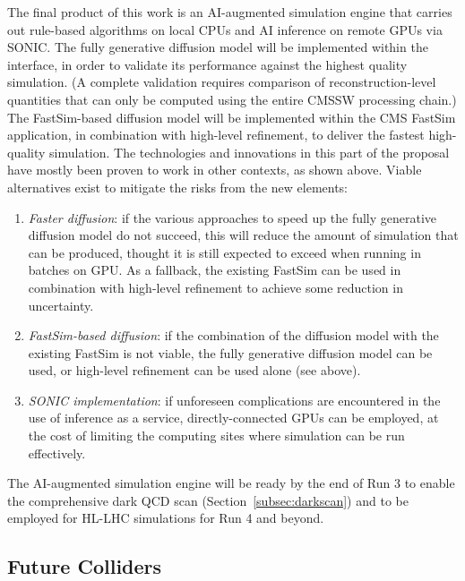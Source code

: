 The final product of this work is an AI-augmented simulation engine
that carries out rule-based algorithms on local CPUs and AI inference on remote GPUs via SONIC.
The fully generative diffusion model will be implemented within the \GEANTfour interface, in order to validate its performance against the highest quality simulation.
(A complete validation requires comparison of reconstruction-level quantities that can only be computed using the entire CMSSW processing chain.)
The FastSim-based diffusion model will be implemented within the CMS FastSim application, in combination with high-level refinement, to deliver the fastest high-quality simulation.
The technologies and innovations in this part of the proposal have mostly been proven to work in other contexts, as shown above.
Viable alternatives exist to mitigate the risks from the new elements:
\begin{enumerate}
\item \textit{Faster diffusion}: if the various approaches to speed up the fully generative diffusion model do not succeed, this will reduce the amount of simulation that can be produced, thought it is still expected to exceed \GEANTfour when running in batches on GPU. As a fallback, the existing FastSim can be used in combination with high-level refinement to achieve some reduction in uncertainty.
\item \textit{FastSim-based diffusion}: if the combination of the diffusion model with the existing FastSim is not viable, the fully generative diffusion model can be used, or high-level refinement can be used alone (see above).
\item \textit{SONIC implementation}: if unforeseen complications are encountered in the use of inference as a service, directly-connected GPUs can be employed, at the cost of limiting the computing sites where simulation can be run effectively.
\end{enumerate}
The AI-augmented simulation engine will be ready by the end of Run 3 to enable the comprehensive dark QCD scan (Section~\ref{subsec:darkscan})
and to be employed for HL-LHC simulations for Run 4 and beyond.

\subsection{Future Colliders}\label{subsec:mucoll}

